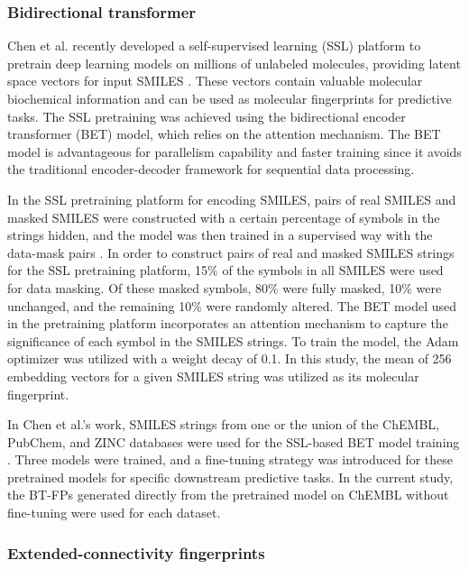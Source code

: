 \documentclass[10pt]{article}
\begin{document}
		
		\subsubsection{Bidirectional transformer }
		
		Chen et al. recently developed a self-supervised learning (SSL) platform to pretrain deep learning models on millions of unlabeled molecules, providing latent space vectors for input SMILES \cite{chen2021extracting}. These vectors contain valuable molecular biochemical information and can be used as molecular fingerprints for predictive tasks. The SSL pretraining was achieved using the bidirectional encoder transformer (BET) model, which relies on the attention mechanism. The BET model is advantageous for parallelism capability and faster training since it avoids the traditional encoder-decoder framework for sequential data processing.
		
		In the SSL pretraining platform for encoding SMILES, pairs of real SMILES and masked SMILES were constructed with a certain percentage of symbols in the strings hidden, and the model was then trained in a supervised way with the data-mask pairs \cite{chen2021extracting}. In order to construct pairs of real and masked SMILES strings for the SSL pretraining platform, 15\% of the symbols in all SMILES were used for data masking. Of these masked symbols, 80\% were fully masked, 10\% were unchanged, and the remaining 10\% were randomly altered. The BET model used in the pretraining platform incorporates an attention mechanism to capture the significance of each symbol in the SMILES strings. To train the model, the Adam optimizer was utilized with a weight decay of 0.1. In this study, the mean of 256 embedding vectors for a given SMILES string was utilized as its molecular fingerprint.
		
		In Chen et al.'s work, SMILES strings from one or the union of the ChEMBL, PubChem, and ZINC databases were used for the SSL-based BET model training \cite{chen2021extracting}. Three models were trained, and a fine-tuning strategy was introduced for these pretrained models for specific downstream predictive tasks. In the current study, the BT-FPs generated directly from the pretrained model on ChEMBL without fine-tuning were used for each dataset.
		
		\subsubsection{Extended-connectivity fingerprints}
		
\end{document}
